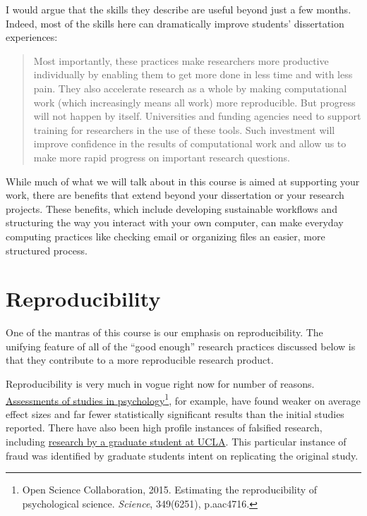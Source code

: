 \documentclass[]{book}
\let\rmarkdownfootnote\footnote%
\def\footnote{\protect\rmarkdownfootnote}
\theoremstyle{definition}
\theoremstyle{definition}
\theoremstyle{definition}
\theoremstyle{remark}
\begin{document}
I would argue that the skills they describe are useful beyond just a few
months. Indeed, most of the skills here can dramatically improve
students' dissertation experiences:

\begin{quote}
Most importantly, these practices make researchers more productive
individually by enabling them to get more done in less time and with
less pain. They also accelerate research as a whole by making
computational work (which increasingly means all work) more
reproducible. But progress will not happen by itself. Universities and
funding agencies need to support training for researchers in the use of
these tools. Such investment will improve confidence in the results of
computational work and allow us to make more rapid progress on important
research questions.
\end{quote}

While much of what we will talk about in this course is aimed at
supporting your work, there are benefits that extend beyond your
dissertation or your research projects. These benefits, which include
developing sustainable workflows and structuring the way you interact
with your own computer, can make everyday computing practices like
checking email or organizing files an easier, more structured process.

\section{Reproducibility}\label{reproducibility}

One of the mantras of this course is our emphasis on reproducibility.
The unifying feature of all of the ``good enough'' research practices
discussed below is that they contribute to a more reproducible research
product.

Reproducibility is very much in vogue right now for number of reasons.
\href{http://science.sciencemag.org/content/349/6251/aac4716}{Assessments
of studies in psychology}\footnote{Open Science Collaboration, 2015.
  Estimating the reproducibility of psychological science.
  \emph{Science}, 349(6251), p.aac4716.}, for example, have found weaker
on average effect sizes and far fewer statistically significant results
than the initial studies reported. There have also been high profile
instances of falsified research, including
\href{http://nymag.com/scienceofus/2015/05/how-a-grad-student-uncovered-a-huge-fraud.html}{research
by a graduate student at UCLA}. This particular instance of fraud was
identified by graduate students intent on replicating the original
study.
\end{document}
